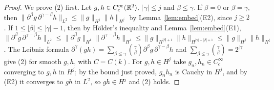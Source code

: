 \begin{proof}
We prove (2) first. Let $g,h\in C_c^\infty(\mathbb{R}^2)$, $|\gamma|\le j$ and
$\beta\le\gamma$. If $\beta=0$ or $\beta=\gamma$, then
$\|\partial^\beta g\,\partial^{\gamma-\beta}h\|_{L^2}\le\|g\|_{H^j}\|h\|_{H^j}$ by
Lemma~\ref{lem:embed}\textup{(E2)}, since $j\ge2$. If
$1\le|\beta|\le|\gamma|-1$, then by H\"older's inequality and
Lemma~\ref{lem:embed}\textup{(E1)},
$\|\partial^\beta g\,\partial^{\gamma-\beta}h\|_{L^2}\le\|\partial^\beta g\|_{H^1}\|\partial^{\gamma-\beta}h\|_{H^1}
\le\|g\|_{H^{|\beta|+1}}\|h\|_{H^{|\gamma|-|\beta|+1}}\le\|g\|_{H^j}\|h\|_{H^j}$.
The Leibniz formula
$\partial^\gamma(gh)=\sum_{\beta\le\gamma}\binom\gamma\beta\partial^\beta g\,\partial^{\gamma-\beta}h$
and $\sum_{\beta\le\gamma}\binom\gamma\beta=2^{|\gamma|}$ give (2) for smooth $g,h$,
with $C=C(k)$. For $g,h\in H^j$ take $g_n,h_n\in C_c^\infty$ converging to
$g,h$ in $H^j$; by the bound just proved, $g_nh_n$ is Cauchy in $H^j$, and by
(E2) it converges to $gh$ in $L^2$, so $gh\in H^j$ and (2) holds.


\end{proof}
